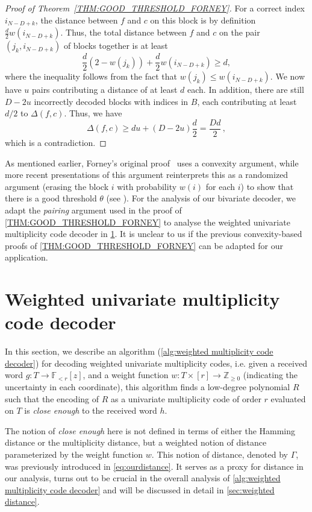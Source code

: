 \documentclass{article}
\def\Integer{\mathbb{Z}}
\def\Field{\mathbb{F}}
\let\Z\Integer
\let\F\Field
\newcommand{\Del}{\Delta}
\begin{document}
\begin{proof}[Proof of Theorem~\ref{THM:GOOD_THRESHOLD_FORNEY}]
		For a correct index $i_{N-D +k}$, the distance between $f$ and $c$ on
		this block is by definition $\frac{d}{2}w(i_{N-D+k})$. Thus, the total distance between $f$ and $c$ on the pair $(j_k, i_{N-D+k})$ of blocks together is at least 
		\[
		\frac{d}{2}(2-w(j_k)) + \frac{d}{2}w(i_{N-D+k}) \geq d,
		\]
		where the inequality follows from the fact that $w(j_k) \leq w(i_{N-D+k})$. We now have $u$ pairs contributing a distance of at least $d$ each. In addition, there are still $D-2u$ incorrectly decoded blocks with indices in $B$, each contributing at least $d/2$ to $\Delta(f,c)$. Thus, we have
		\[ 
		\Del(f,c) \geq du + (D-2u)\frac{d}{2}  = \frac{Dd}{2} \, ,
		\]
		which is a contradiction.
	\end{proof}
	
	As mentioned earlier, Forney's original proof~\cite{Forney1965,
		Forney1966} uses a convexity argument, while more recent
	presentations of this argument reinterprets this as a randomized
	argument (erasing the block $i$ with probability $w(i)$ for each $i$)
	to show that there is a good threshold $\theta$ (see
	\cite[Section~12.3]{GuruswamiRS}). For the analysis of our bivariate decoder,
	we adapt the \emph{pairing} argument used in the proof of
	\cref{THM:GOOD_THRESHOLD_FORNEY} to analyse the weighted univariate
	multiplicity code decoder in \cref{sec:wumd}. It is unclear to us if the previous
	convexity-based proofs of  \cref{THM:GOOD_THRESHOLD_FORNEY} can be
	adapted for our application.
	
	\section{Weighted univariate multiplicity code decoder}\label{sec:wumd}
	
	In this section, we describe an algorithm (\cref{alg:weighted multiplicity code decoder}) for decoding weighted
	univariate multiplicity codes, i.e. given a received word $g\colon T
	\to \F_{<r}[z]$, and a weight function $w\colon  T\times [r]\to
	\Z_{\geq 0}$ (indicating the uncertainty in each coordinate), this algorithm finds a low-degree polynomial $R$ such
	that the encoding of $R$ as a univariate multiplicity code of order
	$r$ evaluated on $T$ is \emph{close enough} to the received word
	$h$. 
	
	The notion of \emph{close enough} here is not defined in
	terms of either the Hamming distance or the multiplicity distance, but a weighted notion of distance parameterized by the weight function $w$. This notion of distance, denoted by $\Gamma$, was previously introduced in \cref{eq:ourdistance}.
	It serves as a proxy for distance in our analysis, turns out to be
	crucial in the overall analysis of \cref{alg:weighted multiplicity code decoder} and will be discussed in detail in \cref{sec:weighted distance}. 
	
\end{document}
